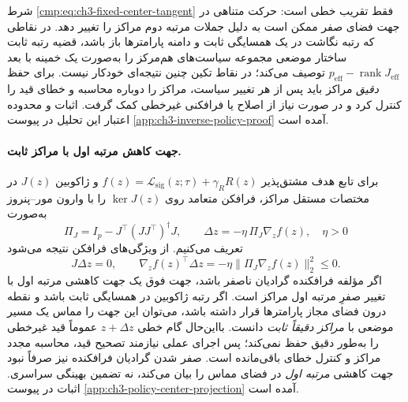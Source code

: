 شرط
\eqref{cmp:eq:ch3-fixed-center-tangent}
فقط تقریب خطی است:
حرکت متناهی در جهت
فضای صفر ممکن است به دلیل
جملات مرتبه دوم مراکز را
تغییر دهد. در نقاطی که
رتبه نگاشت در یک همسایگی
ثابت و دامنه پارامترها
باز باشد، قضیه رتبه ثابت
ساختار موضعی مجموعه
سیاست‌های هم‌مرکز را
به‌صورت یک خمینه با
بعد $p_{\mathrm{eff}}-\operatorname{rank}J_{\mathrm{eff}}$
توصیف می‌کند؛ در نقاط تکین
چنین نتیجه‌ای خودکار نیست.
برای حفظ \emph{دقیق} مراکز
باید پس از هر تغییر سیاست،
مراکز را دوباره محاسبه
و خطای قید را کنترل کرد
و در صورت نیاز از اصلاح
یا فرافکنی غیرخطی کمک گرفت.
اثبات و محدوده اعتبار
این تحلیل در پیوست
\ref{app:ch3-inverse-policy-proof}
آمده است.



\paragraph{جهت کاهش مرتبه اول با مراکز ثابت.}
برای تابع هدف مشتق‌پذیر
$f(z)=\mathcal L_{\mathrm{sig}}(z;\tau)
+\gamma_RR(z)$
و ژاکوبین $J(z)$
در مختصات مستقل مراکز،
فرافکن متعامد
روی $\ker J(z)$
را با وارون مور--پنروز
به‌صورت
\begin{equation}\label{cmp:eq:ch3-fixed-center-projection}
\boxed{
\Pi_J=I_p-J^\top(JJ^\top)^\dagger J,
\qquad
\Delta z=-\eta\,\Pi_J\nabla_z f(z),
\quad\eta>0
}
\end{equation}
تعریف می‌کنیم.
از ویژگی‌های فرافکن
نتیجه می‌شود
\begin{equation}\label{cmp:eq:ch3-fixed-center-projection-descent}
\boxed{
J\Delta z=0,
\qquad
\nabla_z f(z)^\top\Delta z
=-\eta\|\Pi_J\nabla_z f(z)\|_2^2\le0.
}
\end{equation}
اگر مؤلفه فرافکنده
گرادیان ناصفر باشد،
جهت فوق یک جهت
کاهشی مرتبه اول
با تغییر صفرِ
مرتبه اول مراکز
است. اگر رتبه ژاکوبین
در همسایگی ثابت باشد
و نقطه درون فضای
مجاز پارامترها قرار
داشته باشد، می‌توان
این جهت را مماس
یک مسیر موضعی
با \emph{مراکز
دقیقاً ثابت} دانست.
بااین‌حال گام خطی
$z+\Delta z$
عموماً قید غیرخطی
را به‌طور دقیق
حفظ نمی‌کند؛
پس اجرای عملی
نیازمند تصحیح قید،
محاسبه مجدد مراکز
و کنترل خطای
باقی‌مانده است.
صفر شدن گرادیان
فرافکنده نیز
صرفاً نبود جهت
کاهشی \emph{مرتبه اول}
در فضای مماس را
بیان می‌کند،
نه تضمین بهینگی
سراسری. اثبات در
پیوست
\ref{app:ch3-policy-center-projection}
آمده است.


